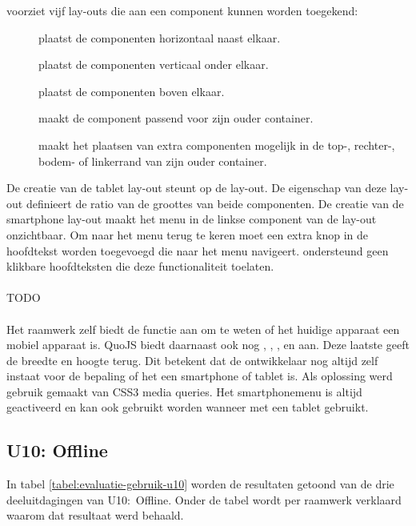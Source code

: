 \st{} voorziet vijf lay-outs die aan een component kunnen worden toegekend:
\begin{description}
 \item [] plaatst de componenten horizontaal naast elkaar.
 \item [] plaatst de componenten verticaal onder elkaar.
 \item [] plaatst de componenten boven elkaar.
 \item [] maakt de component passend voor zijn ouder container.
 \item [] maakt het plaatsen van extra componenten mogelijk in de top-, rechter-, bodem- of linkerrand van zijn ouder container.
\end{description}
De creatie van de tablet lay-out steunt op de  lay-out.
De  eigenschap van deze lay-out definieert de ratio van de groottes van beide componenten.
De creatie van de smartphone lay-out maakt het menu in de linkse component van de lay-out onzichtbaar.
Om naar het menu terug te keren moet een extra knop in de hoofdtekst worden toegevoegd die naar het menu navigeert.
\st{} ondersteund geen klikbare hoofdteksten die deze functionaliteit toelaten.

\paragraph{\kendo}
TODO

\paragraph{\lungo}
Het raamwerk zelf biedt de functie  aan om te weten of het huidige apparaat een mobiel apparaat is.
QuoJS biedt daarnaast ook nog , , ,  en  aan.
Deze laatste geeft de breedte en hoogte terug.
Dit betekent dat de ontwikkelaar nog altijd zelf instaat voor de bepaling of het een smartphone of tablet is.
Als oplossing werd gebruik gemaakt van CSS3 media queries.
Het smartphonemenu is altijd geactiveerd en kan ook gebruikt worden wanneer met een tablet gebruikt.


\subsection{U10: Offline}
In tabel \ref{tabel:evaluatie-gebruik-u10} worden de resultaten getoond van de drie deeluitdagingen van U10:~Offline.
Onder de tabel wordt per raamwerk verklaard waarom dat resultaat werd behaald.

